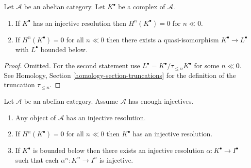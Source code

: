 \begin{lemma}
\label{lemma-cohomology-bounded-below}
Let $\mathcal{A}$ be an abelian category.
Let $K^\bullet$ be a complex of $\mathcal{A}$.
\begin{enumerate}
\item If $K^\bullet$ has an injective resolution then
$H^n(K^\bullet) = 0$ for $n \ll 0$.
\item If $H^n(K^\bullet) = 0$ for all $n \ll 0$ then there
exists a quasi-isomorphism $K^\bullet \to L^\bullet$
with $L^\bullet$ bounded below.
\end{enumerate}
\end{lemma}

\begin{proof}
Omitted. For the second statement use
$L^\bullet = K^\bullet / \tau_{\leq n}K^\bullet$ for
some $n \ll 0$. See
Homology, Section \ref{homology-section-truncations}
for the definition of the truncation $\tau_{\leq n}$.
\end{proof}

\begin{lemma}
\label{lemma-injective-resolutions-exist}
Let $\mathcal{A}$ be an abelian category.
Assume $\mathcal{A}$ has enough injectives.
\begin{enumerate}
\item Any object of $\mathcal{A}$ has an injective resolution.
\item If $H^n(K^\bullet) = 0$ for all $n \ll 0$ then
$K^\bullet$ has an injective resolution.
\item If $K^\bullet$ is bounded below then there exists
an injective resolution $\alpha : K^\bullet \to I^\bullet$
such that each $\alpha^n : K^n \to I^n$ is injective.
\end{enumerate}
\end{lemma}

